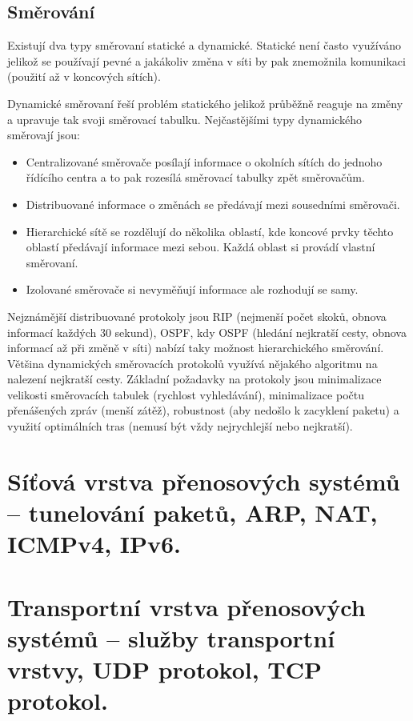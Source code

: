 \subsection{Směrování}

Existují dva typy směrovaní statické a dynamické. Statické není často využíváno jelikož se používají pevné a jakákoliv změna v síti by pak znemožnila komunikaci (použití až v koncových sítích). 

Dynamické směrovaní řeší problém statického jelikož průběžně reaguje na změny a upravuje tak svoji směrovací tabulku. Nejčastějšími typy dynamického směrovají jsou:

\begin{itemize}[noitemsep]
    \item Centralizované směrovače posílají informace o okolních sítích do jednoho řídícího centra a to pak rozesílá směrovací tabulky zpět směrovačům.
    \item Distribuované informace o změnách se předávají mezi sousedními směrovači. 
    \item Hierarchické sítě se rozdělují do několika oblastí, kde koncové prvky těchto oblastí předávají informace mezi sebou. Každá oblast si provádí vlastní směrovaní.
    \item Izolované směrovače si nevyměňují informace ale rozhodují se samy.
\end{itemize}

Nejznámější distribuované protokoly jsou RIP (nejmenší počet skoků, obnova informací každých 30 sekund), OSPF, kdy OSPF (hledání nejkratší cesty, obnova informací až při změně v síti) nabízí taky možnost hierarchického směrování. Většina dynamických směrovacích protokolů využívá nějakého algoritmu na nalezení nejkratší cesty. Základní požadavky na protokoly jsou minimalizace velikosti směrovacích tabulek (rychlost vyhledávání), minimalizace počtu přenášených zpráv (menší zátěž), robustnost (aby nedošlo k zacyklení paketu) a využití optimálních tras (nemusí být vždy nejrychlejší nebo nejkratší).

\clearpage
\section{Síťová vrstva přenosových systémů -- tunelování paketů, ARP, NAT, ICMPv4, IPv6.}

\clearpage
\section{Transportní vrstva přenosových systémů -- služby transportní vrstvy, UDP protokol, TCP protokol.}

